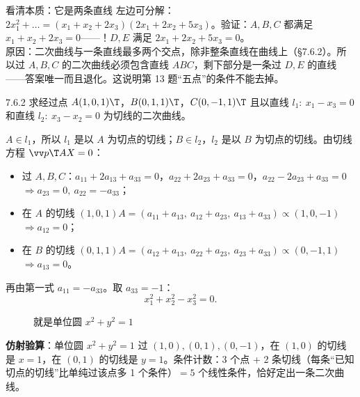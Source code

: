 \begin{intbox}{看清本质：它是两条直线}
左边可分解：$2x_1^2+\dots=(x_1+x_2+2x_3)(2x_1+2x_2+5x_3)$。验证：$A,B,C$ 都满足 $x_1+x_2+2x_3=0$——！$D,E$ 满足 $2x_1+2x_2+5x_3=0$。\\
原因：二次曲线与一条直线最多两个交点，除非整条直线在曲线上（\S7.6.2）。所以过 $A,B,C$ 的二次曲线必须包含直线 $ABC$，剩下部分是一条过 $D,E$ 的直线——答案唯一而且退化。这说明第 13 题“五点”的条件不能去掉。
\end{intbox}

\begin{ex}{7.6.2}
求经过点 $A(1,0,1)\T$，$B(0,1,1)\T$，$C(0,-1,1)\T$ 且以直线 $l_1:\ x_1-x_3=0$ 和直线 $l_2:\ x_3-x_2=0$ 为切线的二次曲线。
\end{ex}
\jie $A\in l_1$，所以 $l_1$ 是以 $A$ 为切点的切线；$B\in l_2$，$l_2$ 是以 $B$ 为切点的切线。由切线方程 $\vv p\T AX=0$：
\begin{itemize}
\item 过 $A,B,C$：$a_{11}+2a_{13}+a_{33}=0$，$a_{22}+2a_{23}+a_{33}=0$，$a_{22}-2a_{23}+a_{33}=0$ $\Rightarrow a_{23}=0,\ a_{22}=-a_{33}$；
\item 在 $A$ 的切线 $(1,0,1)A=(a_{11}+a_{13},\ a_{12}+a_{23},\ a_{13}+a_{33})\propto(1,0,-1)$ $\Rightarrow a_{12}=0$；
\item 在 $B$ 的切线 $(0,1,1)A=(a_{12}+a_{13},\ a_{22}+a_{23},\ a_{23}+a_{33})\propto(0,-1,1)$ $\Rightarrow a_{13}=0$。
\end{itemize}
再由第一式 $a_{11}=-a_{33}$。取 $a_{33}=-1$：
\[
x_1^2+x_2^2-x_3^2=0 .
\]
\begin{figure}[htbp]
\centering
{}
\caption{就是单位圆 $x^2+y^2=1$}
\end{figure}

\noindent\textbf{仿射验算}：单位圆 $x^2+y^2=1$ 过 $(1,0),(0,1),(0,-1)$，在 $(1,0)$ 的切线是 $x=1$，在 $(0,1)$ 的切线是 $y=1$。\checkmark\quad 条件计数：3 个点 + 2 条切线（每条“已知切点的切线”比单纯过该点多 1 个条件）$=5$ 个线性条件，恰好定出一条二次曲线。

